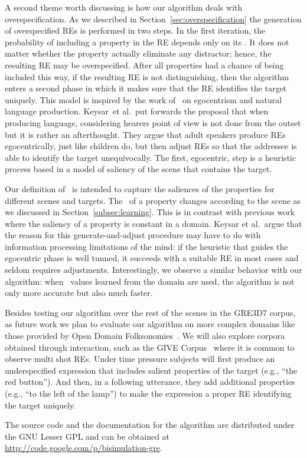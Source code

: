 A second theme worth discussing is how our algorithm deals with overspecification. As we described in Section~\ref{sec:overspecification} the generation of overspecified REs is performed in two steps. In the first iteration, the probability of including a property in the RE depends only on its \puse. It does not matter whether the property actually eliminate any distractor; hence, the resulting RE may be overspecified. After all properties had a chance of being included this way, if the resulting RE is not distinguishing, then the algorithm enters a second phase in which it makes sure that the RE identifies the target uniquely.  This model is inspired by the work of~ on egocentrism and natural language production.  Keysar~et al.\ put forwards the proposal that when producing language, considering hearers point of view is not done from the outset but it is rather an afterthought. They argue that adult speakers produce REs egocentrically, just like children do, but then adjust REs so that the addressee is able to identify the target unequivocally. The first, egocentric, step is a heuristic process based in a model of saliency of the scene that contains the target. 

Our definition of \puse\ is intended to capture the saliences of the properties for different scenes and targets. The \puse\ of a property changes according to the scene as we discussed in Section~\ref{subsec:learning}. This is in contrast with previous work where the saliency of a property is constant in a domain. Keysar et al.~argue that the reason for this generate-and-adjust procedure may have to do with information processing limitations of the mind: if the heuristic that guides the egocentric phase is well tunned, it succeeds with a suitable RE in most cases and seldom requires adjustments. Interestingly, we observe a similar behavior with our algorithm: when \puse\ values learned from the domain are used, the algorithm is not only more accurate but also much faster. 

Besides testing our algorithm over the rest of the scenes in the GRE3D7 corpus, as future work we plan to evaluate our algorithm on more complex domains like those provided by Open Domain Folksonomies~\cite{pacheco-duboue-dominguez:2012:NAACL-HLT}. We will also explore corpora obtained through interaction, such as the GIVE Corpus~\cite{GarGarKolStr10} where it is common to observe multi shot REs. Under time pressure subjects will first produce an underspecified expression that includes salient properties of the target (e.g., ``the red button'').  And then, in a following utterance, they add additional properties (e.g., ``to the left of the lamp'') to make the expression a proper RE  identifying the target uniquely.

The source code and the documentation for the algorithm are distributed under the GNU Lesser GPL and can be obtained at \url{http://code.google.com/p/bisimulation-gre}.
